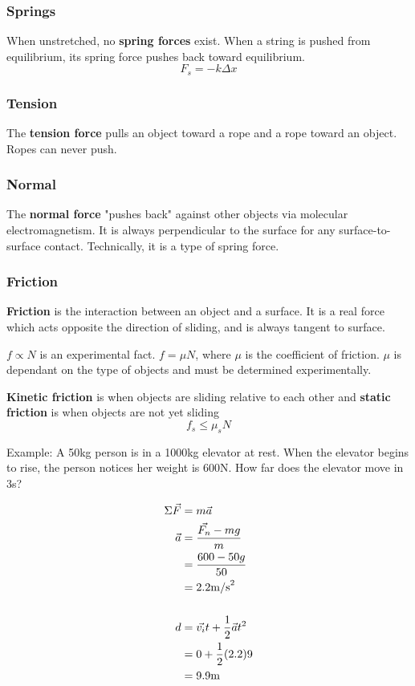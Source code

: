\documentclass[12pt]{article}
\begin{document}
\subsubsection*{Springs}
When unstretched, no {\bf spring forces} exist. When a string is pushed from equilibrium, its spring force pushes back toward equilibrium.
\[ F_s = -k\Delta x \]

\subsubsection*{Tension}
The {\bf tension force} pulls an object toward a rope and a rope toward an object. Ropes can never push.

\subsubsection*{Normal}
The {\bf normal force} "pushes back" against other objects via molecular electromagnetism. It is always perpendicular to the surface for any surface-to-surface contact. Technically, it is a type of spring force.

\subsubsection*{Friction}
{\bf Friction} is the interaction between an object and a surface. It is a real force which acts opposite the direction of sliding, and is always tangent to surface.

$f \propto N$ is an experimental fact. $f = \mu N$, where $\mu$ is the coefficient of friction. $\mu$ is dependant on the type of objects and must be determined experimentally.

{\bf Kinetic friction} is when objects are sliding relative to each other and {\bf static friction} is when objects are not yet sliding \[ f_s \leq \mu_s N \]

Example: A 50kg person is in a 1000kg elevator at rest. When the elevator begins to rise, the person notices her weight is 600N. How far does the elevator move in 3s?

\begin{align*}
\Sigma\vec{F} &= m\vec{a}\\
\vec{a} &= \frac{\vec{F_n}-mg}{m}\\
&= \frac{600-50g}{50}\\
&= 2.2{\rm m/s}^2\\\\
d &= \vec{v_i}t + \frac{1}{2}\vec{a}t^2\\
&= 0 + \frac{1}{2}(2.2)9\\
&= 9.9{\rm m}
\end{align*}
\end{document}
